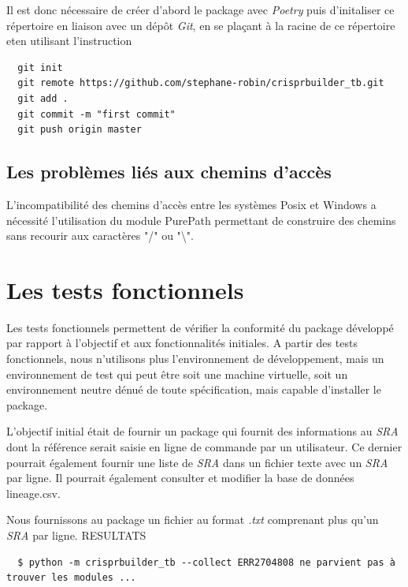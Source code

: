 \documentclass[twoside,a4paper,11pt,frenchb,openany]{report}
\begin{document}
Il est donc nécessaire de créer d'abord le package avec \textit{Poetry} puis d'initaliser ce répertoire en liaison avec un dépôt \textit{Git}, en se plaçant à la racine de ce répertoire eten utilisant l'instruction

\begin{verbatim}
  git init
  git remote https://github.com/stephane-robin/crisprbuilder_tb.git
  git add .
  git commit -m "first commit"
  git push origin master
\end{verbatim} 


\subsection{Les problèmes liés aux chemins d'accès}

L'incompatibilité des chemins d'accès entre les systèmes Posix et Windows a nécessité l'utilisation du module PurePath permettant de construire des chemins sans recourir aux caractères "/" ou "\textbackslash".



\section{Les tests fonctionnels}

Les tests fonctionnels permettent de vérifier la conformité du package développé par rapport à l'objectif et aux fonctionnalités initiales. A partir des tests fonctionnels, nous n'utilisons plus l'environnement de développement, mais un environnement de test qui peut être soit une machine virtuelle, soit un environnement neutre dénué de toute spécification, mais capable d'installer le package.

L'objectif initial était de fournir un package qui fournit des informations au \textit{SRA} dont la référence serait saisie en ligne de commande par un utilisateur. Ce dernier pourrait également fournir une liste de \textit{SRA} dans un fichier texte avec un \textit{SRA} par ligne. Il pourrait également consulter et modifier la base de données lineage.csv.

Nous fournissons au package un fichier au format \textit{.txt} comprenant plus qu'un \textit{SRA} par ligne. RESULTATS  

\begin{verbatim}
  $ python -m crisprbuilder_tb --collect ERR2704808 ne parvient pas à trouver les modules ...
\end{verbatim}
\end{document}
